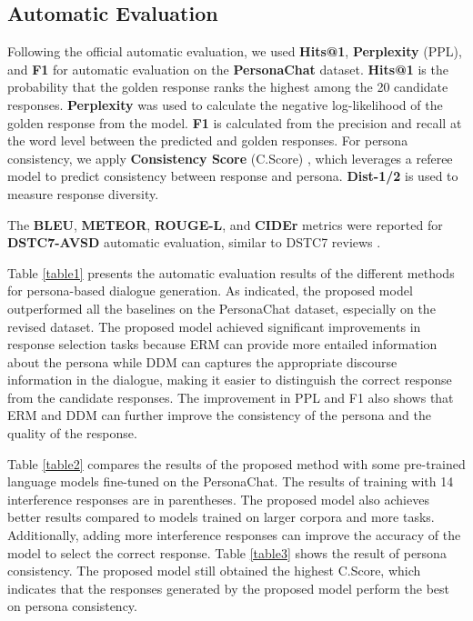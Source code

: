 \documentclass[letterpaper]{article} \usepackage{aaai23}  \usepackage{times}  \usepackage{helvet}  \usepackage{courier}  \usepackage[hyphens]{url}  \usepackage{graphicx} \urlstyle{rm} \def\UrlFont{\rm}  \usepackage{natbib}  \usepackage{caption} \frenchspacing  \setlength{\pdfpagewidth}{8.5in}  \setlength{\pdfpageheight}{11in}  \usepackage{algorithm}
\begin{document}
\subsection{Automatic Evaluation}
Following the official automatic evaluation, we used \textbf{Hits@1}, \textbf{Perplexity} (PPL), and \textbf{F1} for automatic evaluation on the \textbf{PersonaChat} dataset. \textbf{Hits@1} is the probability that the golden response ranks the highest among the 20 candidate responses. \textbf{Perplexity} was used to calculate the negative log-likelihood of the golden response from the model. \textbf{F1} is calculated from the precision and recall at the word level between the predicted  and golden responses. For persona consistency, we apply \textbf{Consistency Score} (C.Score) \cite{Madotto2020}, which leverages a referee model to predict consistency between response and persona. \textbf{Dist-1/2} \cite{Li2016a} is used to measure response diversity.

The \textbf{BLEU}, \textbf{METEOR}, \textbf{ROUGE-L}, and \textbf{CIDEr} metrics were reported for \textbf{DSTC7-AVSD} automatic evaluation, similar to DSTC7 reviews \cite{Alamri2019}. 

Table \ref{table1} presents the automatic evaluation results of the different methods for persona-based dialogue generation. As indicated, the proposed model outperformed all the baselines on the PersonaChat dataset, especially on the revised dataset. The proposed model achieved significant improvements in response selection tasks because ERM can provide more entailed information about the persona while DDM can captures the appropriate discourse information in the dialogue, making it easier to distinguish the correct response from the candidate responses. The improvement in PPL and F1 also shows that ERM and DDM can further improve the consistency of the persona and the quality of the response.

Table \ref{table2} compares the results of the proposed method with some pre-trained language models fine-tuned on the PersonaChat. The results of training with 14 interference responses are in parentheses. The proposed model also achieves better results compared to models trained on larger corpora and more tasks. Additionally, adding more interference responses can improve the accuracy of the model to select the correct response. Table \ref{table3} shows the result of persona consistency. The proposed model still obtained the highest C.Score, which indicates that the responses generated by the proposed model perform the best on persona consistency.
\end{document}

